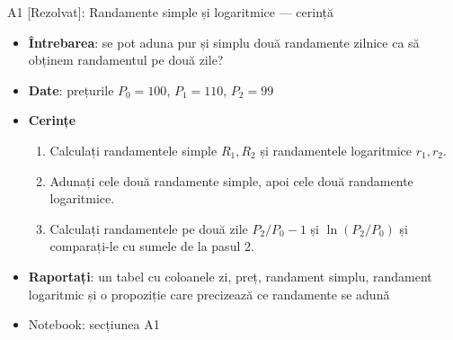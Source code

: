 \begin{frame}{A1 [Rezolvat]: Randamente simple și logaritmice --- cerință}
\itemsize{\small}
\begin{itemize}
\item \textbf{Întrebarea}: se pot aduna pur și simplu două randamente zilnice ca să obținem randamentul pe două zile?
\item \textbf{Date}: prețurile $P_0 = 100$, $P_1 = 110$, $P_2 = 99$
\item \textbf{Cerințe}
\begin{enumerate}
    \item Calculați randamentele simple $R_1, R_2$ și randamentele logaritmice $r_1, r_2$.
    \item Adunați cele două randamente simple, apoi cele două randamente logaritmice.
    \item Calculați randamentele pe două zile $P_2/P_0 - 1$ și $\ln(P_2/P_0)$ și comparați-le cu sumele de la pasul 2.
\end{enumerate}
\item \textbf{Raportați}: un tabel cu coloanele zi, preț, randament simplu, randament logaritmic și o propoziție care precizează ce randamente se adună
\item Notebook: secțiunea A1
\end{itemize}
\end{frame}

